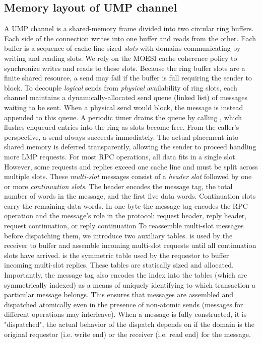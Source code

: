 \subsection{Memory layout of UMP channel}
A UMP channel is a shared-memory frame divided into two circular ring buffers.
Each side of the connection writes into one buffer and reads from the other.
Each buffer is a sequence of cache-line-sized \textit{slots} with domains communicating
by writing and reading slots. We rely on the MOESI cache coherence policy to synchronize
writes and reads to these slots.
 \newline
 \newline
\noindent
Because the ring buffer slots are a finite shared resource, a send may fail if
the buffer is full requiring the sender to block. To decouple \textit{logical}
sends from \textit{physical} availability of ring slots, each channel maintains a
dynamically-allocated send queue (linked list) of messages waiting to be sent.
When a physical send would block, the message is instead appended to
this queue. A periodic timer drains the queue by calling ,
which flushes enqueued entries into the ring as slots become free. From the
caller's perspective, a send always succeeds immediately. The actual placement
into shared memory is deferred transparently, allowing the sender to proceed handling
more LMP requests. \newline
\newline
\noindent
For most RPC operations, all data fits in a single slot. However, some requests
and replies exceed one cache line and must be split across multiple slots. These
\textit{multi-slot }messages consist of a \textit{header slot} followed by one or
more \textit{continuation slots}. The header encodes the message tag, the total
number of words in the message, and the first five data words. Continuation slots
carry the remaining data words. In one byte the message tag encodes the RPC operation and
the message's role in the protocol: request header, reply header, request
continuation, or reply continuation\newline
 \newline
\noindent
To reassemble multi-slot messages before dispatching them, we introduce two
auxiliary tables.  is used by the receiver to buffer and
assemble incoming multi-slot requests until all continuation slots have arrived.
 is the symmetric table used by the requestor to buffer
incoming multi-slot replies. These tables are statically sized and allocated. Importantly, the message tag also encodes
the index into the tables (which are symmetrically indexed) as a means of uniquely identifying to which transaction a
particular message belongs. This ensures that messages are assembled and dispatched
atomically even in the presence of non-atomic sends (messages for different operations may interleave).
When a message is fully constructed, it is "dispatched", the actual behavior of the dispatch depends
on if the domain is the original requestor (i.e. write end) or the receiver (i.e. read end) for the message.

